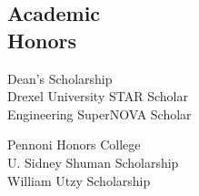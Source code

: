 \documentclass[margin]{res}
\begin{document}
\begin{resume}
\section{Academic \\ Honors}
\begin{minipage}[t]{0.5\linewidth}
Dean's Scholarship \\
Drexel University STAR Scholar \\
Engineering SuperNOVA Scholar \\
\end{minipage}
\begin{minipage}[t]{0.5\linewidth}
Pennoni Honors College \\
U. Sidney Shuman Scholarship \\
William Utzy Scholarship \\
\end{minipage}


\end{resume}
\end{document}
